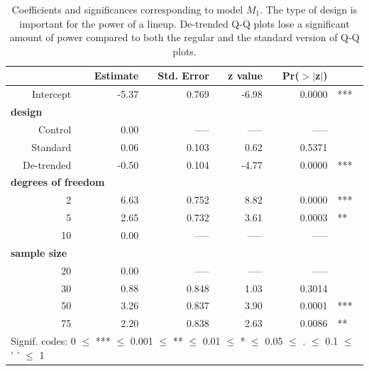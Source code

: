 \documentclass{article}\usepackage[]{graphicx}\usepackage[]{color}
\begin{document}

\begin{table}[ht]
\centering
\caption{\label{tab:model} Coefficients and significances corresponding to  model $M_1$. The type of design is important for the power of a lineup. De-trended Q-Q plots lose a significant amount of power compared to both the regular and the standard version of Q-Q plots. }
\begin{tabular}{rrrrrl}
  \hline
 &\bf Estimate &\bf Std. Error &\bf z value &\bf Pr($>$$|$z$|$) & \\ 
  \hline
  Intercept &  -5.37 & 0.769 & -6.98 & 0.0000  & *** \\ [3pt]
\multicolumn{3}{l}{\bf design} \\
   Control & 0.00 & ----- & ----- & ----- \\ 
   Standard & 0.06 & 0.103 & 0.62 & 0.5371 \\
   De-trended & -0.50 & 0.104 & -4.77 & 0.0000 & ***\\  [3pt]
\multicolumn{4}{l}{\bf degrees of freedom} \\
  2 & 6.63 & 0.752 & 8.82 & 0.0000 & ***\\ 
  5 & 2.65 & 0.732 & 3.61 & 0.0003 & **\\ 
  10 & 0.00 & ----- & ----- & ----- \\ [3pt]
\multicolumn{3}{l}{\bf sample size} \\
  20 & 0.00 & ----- & ----- & ----- \\ 
  30 & 0.88 & 0.848 & 1.03 & 0.3014 \\ 
  50  & 3.26 & 0.837 & 3.90 & 0.0001 & ***\\ 
  75 & 2.20 & 0.838 & 2.63 & 0.0086  & **\\ 
   \hline
\multicolumn{6}{l}{Signif. codes:  0 $\le$ *** $\le$ 0.001 $\le$ ** $\le$ 0.01 $\le$ * $\le$ 0.05 $\le$ . $\le$ 0.1 $\le$ ' ' $\le$ 1}
\end{tabular}
\end{table}
\end{document}
